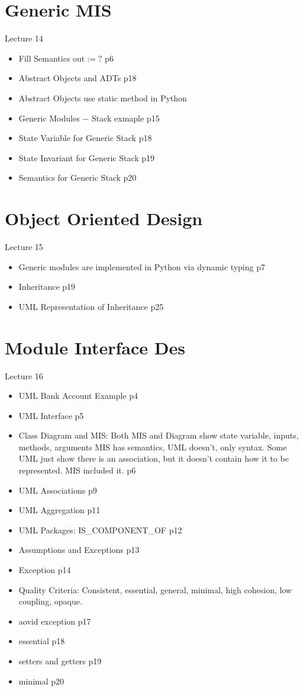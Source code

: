 \documentclass[12pt]{article}
\begin{document}
\section{Generic MIS}
Lecture 14
\begin{itemize}
    \item Fill Semantics out$:=?$ p6
    \item Abstract Objects and ADTs p18
    \item Abstract Objects use static method in Python
    \item Generic Modules $-$ Stack exmaple p15
    \item State Variable for Generic Stack p18
    \item State Invariant for Generic Stack p19
    \item Semantics for Generic Stack p20
\end{itemize}

\section{Object Oriented Design}
Lecture 15
\begin{itemize}
    \item Generic modules are implemented in Python via dynamic typing p7
    \item Inheritance p19
    \item UML Representation of Inheritance p25
\end{itemize}

\section{Module Interface Des}
Lecture 16
\begin{itemize}
    \item UML Bank Account Example p4
    \item UML Interface p5
    \item Class Diagram and MIS: Both MIS and Diagram show state variable, inputs, methods, arguments MIS has semantics, 
    UML doesn’t, only syntax. Some UML just show there is an association, but it doesn’t contain how it to be represented. 
    MIS included it. p6
    \item UML Associations p9
    \item UML Aggregation p11
    \item UML Packages: IS\_COMPONENT\_OF p12
    \item Assumptions and Exceptions p13
    \item Exception p14 
    \item Quality Criteria: Consistent, essential, general, minimal, high cohesion, low coupling, opaque.
    \item aovid exception p17
    \item essential p18
    \item setters and getters p19
    \item minimal p20
\end{itemize}
\end{document}
